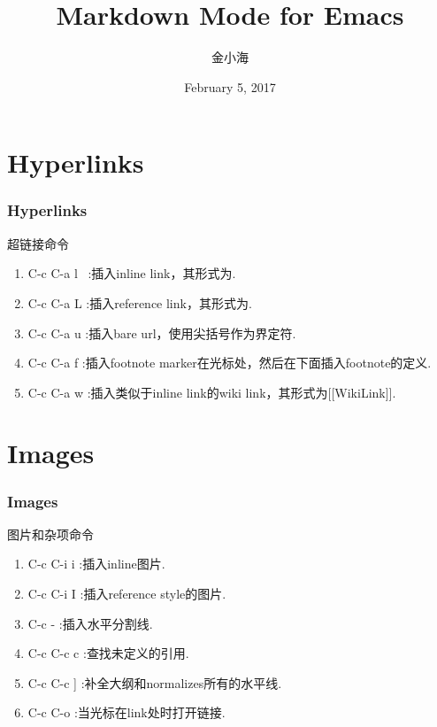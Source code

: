 \documentclass[11pt]{beamer}
\title{Markdown Mode for Emacs}
\author{金小海}
\institute{Shanghai Institute of Applied Physics, CAS}
\date{February 5, 2017}
\begin{document}
\begin{frame}
  \maketitle
\end{frame}


\section{Hyperlinks}
\begin{frame}
  \frametitle{Hyperlinks}
  \begin{block}{超链接命令}
    \begin{enumerate}
    \item C-c C-a l ~:{插入inline link，其形式为\color{darkmagenta}{[text](url)}.}
    \item C-c C-a L :{插入reference link，其形式为\color{darkmagenta}{[text][label]}.}
    \item C-c C-a u :{插入bare url，使用尖括号作为界定符.}
    \item C-c C-a f :{插入footnote marker在光标处，然后在下面插入footnote的定义.}
    \item C-c C-a w :{插入类似于inline link的wiki link，其形式为[[WikiLink]].}
    \end{enumerate}
  \end{block}
\end{frame}

\section{Images}
\begin{frame}
  \frametitle{Images}
  \begin{block}{图片和杂项命令}
    \begin{enumerate}
    \item C-c C-i i :{插入inline图片.}
    \item C-c C-i I :{插入reference style的图片.}
    \item C-c - :{插入水平分割线.}
    \item C-c C-c c :{查找未定义的引用.}
    \item C-c C-c ] :{补全大纲和normalizes所有的水平线.}
    \item C-c C-o :{当光标在link处时打开链接.}
    \end{enumerate}
  \end{block}
\end{frame}
\end{document}
